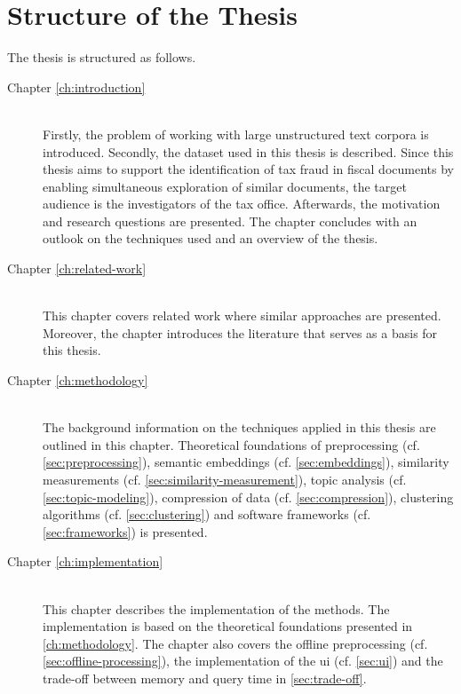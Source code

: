 
\section{Structure of the Thesis}\label{sec:structure-of-the-thesis}
The thesis is structured as follows.

\begin{description}
    \item[Chapter \ref{ch:introduction}] \hfill \\
        Firstly, the problem of working with large unstructured text corpora is introduced.
        Secondly, the dataset used in this thesis is described.
        Since this thesis aims to support the identification of tax fraud in fiscal documents 
        by enabling simultaneous exploration of similar documents, 
        the target audience is the investigators of the tax office.
        Afterwards, the motivation and research questions are presented.
        The chapter concludes with an outlook on the techniques used and an overview of the thesis.
    
    \item[Chapter \ref{ch:related-work}] \hfill \\
        This chapter covers related work where similar approaches are presented.
        Moreover, the chapter introduces the literature that serves as a basis for this thesis.

    \item[Chapter \ref{ch:methodology}] \hfill \\
        The background information on the techniques applied in this thesis are outlined in this chapter.
        Theoretical foundations of preprocessing (cf. \autoref{sec:preprocessing}), 
        semantic embeddings (cf. \autoref{sec:embeddings}), 
        similarity measurements (cf. \autoref{sec:similarity-measurement}),
        topic analysis (cf. \autoref{sec:topic-modeling}),
        compression of data (cf. \autoref{sec:compression}),
        clustering algorithms (cf. \autoref{sec:clustering})
        and software frameworks (cf. \autoref{sec:frameworks})
        is presented.

    \item[Chapter \ref{ch:implementation}] \hfill \\  
        This chapter describes the implementation of the methods.
        The implementation is based on the theoretical foundations presented in \autoref{ch:methodology}.
        The chapter also covers the offline preprocessing (cf. \autoref{sec:offline-processing}),
        the implementation of the \ac{ui} (cf. \autoref{sec:ui})
        and the trade-off between memory and query time in \autoref{sec:trade-off}.


\end{description}
